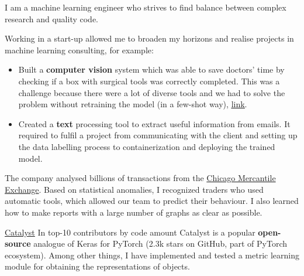 \documentclass[10pt,a4paper,ragged2e,withhyper]{altacv}
\begin{document}


\makecvheader


\smallskip
I am a machine learning engineer who strives to find balance between complex research and quality code.

\begin{paracol}{2}


Working in a start-up allowed me to broaden my horizons and realise projects in machine learning consulting, for example:
\begin{itemize}
\item Built a \textbf{computer vision} system which was able to save doctors' time by checking if a box with surgical tools was correctly completed. This was a challenge because there were a lot of diverse tools and we had to solve the problem without retraining the model (in a few-shot way), \href{https://drive.google.com/file/d/1FBNRTkxkGzzfVHlrwJCauK7xjBWkI7xO/view?usp=sharing}{\underline{link}}.
\item Created a \textbf{text} processing tool to extract useful information from emails. It required to fulfil a project from communicating with the client and setting up the data labelling process to containerization and deploying the trained model.
\end{itemize}

\divider

The company analysed billions of transactions from the \href{https://en.wikipedia.org/wiki/Chicago_Mercantile_Exchange}
{Chicago Mercantile Exchange}.
Based on statistical anomalies, I recognized traders who used automatic tools, which allowed our team to predict their behaviour.
I also learned how to make reports with a large number of graphs as clear as possible.


\cvevent
{\href{https://github.com/catalyst-team/catalyst}{Catalyst}}
{In top-10 contributors by code amount}{}{}
Catalyst is a popular \textbf{open-source} analogue of Keras for PyTorch (2.3k stars on GitHub, part of PyTorch ecosystem).
Among other things, I have implemented and tested a metric learning module for obtaining the representations of objects.
\smallskip


\end{paracol}
\end{document}
